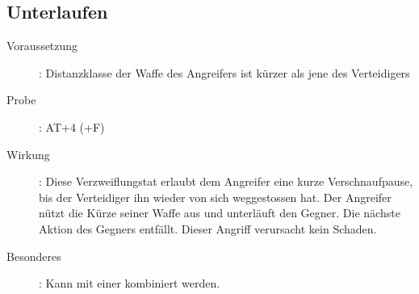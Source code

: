 \subsection{Unterlaufen}
\label{aktion.unterlaufen}
\begin{description}
    \item[Voraussetzung]:
        Distanzklasse der Waffe des Angreifers ist kürzer als jene des Verteidigers
    \item[Probe]:
        AT+4 (+F)
    \item[Wirkung]:
        Diese Verzweiflungstat erlaubt dem Angreifer eine kurze Verschnaufpause, bis der Verteidiger ihn wieder von sich weggestossen hat.
        Der Angreifer nützt die Kürze seiner Waffe aus und unterläuft den Gegner.
        Die nächste Aktion des Gegners entfällt.
        Dieser Angriff verursacht kein Schaden.
    \item[Besonderes]:
        Kann mit einer  kombiniert werden.
\end{description}

